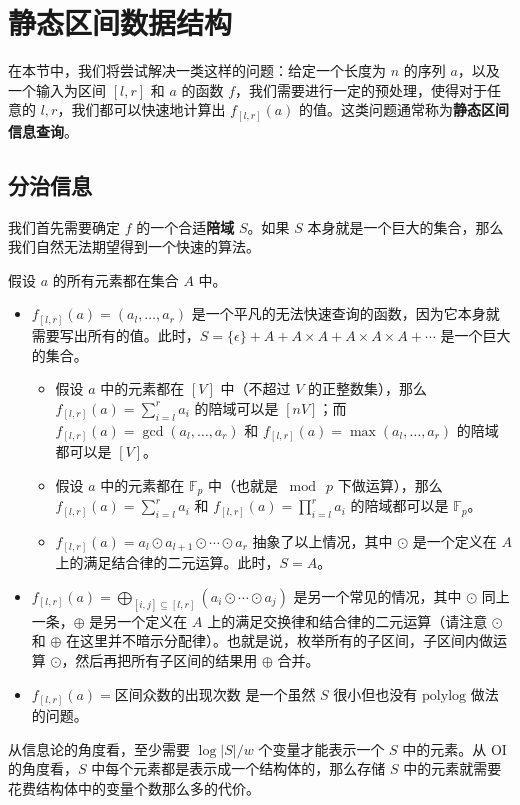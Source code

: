 \chapter{静态区间数据结构}

在本节中，我们将尝试解决一类这样的问题：给定一个长度为 $n$ 的序列 $a$，以及一个输入为区间 $[l,r]$ 和 $a$ 的函数 $f$，我们需要进行一定的预处理，使得对于任意的 $l,r$，我们都可以快速地计算出 $f_{[l,r]}(a)$ 的值。这类问题通常称为\textbf{静态区间信息查询}。


\section{分治信息}

我们首先需要确定 $f$ 的一个合适\textbf{陪域} $S$。如果 $S$ 本身就是一个巨大的集合，那么我们自然无法期望得到一个快速的算法。
\begin{example}
    假设 $a$ 的所有元素都在集合 $A$ 中。
    \begin{itemize}
        \item $f_{[l,r]}(a)=(a_l,\ldots,a_r)$ 是一个平凡的无法快速查询的函数，因为它本身就需要写出所有的值。此时，$S=\{\epsilon\}+A+ A\times A+ A\times A\times A+\cdots$ 是一个巨大的集合。
        \begin{itemize}
            \item 假设 $a$ 中的元素都在 $[V]$ 中（不超过 $V$ 的正整数集），那么 $f_{[l,r]}(a)=\sum_{i=l}^r a_i$ 的陪域可以是 $[nV]$；而 $f_{[l,r]}(a)=\gcd(a_{l},\ldots,a_{r})$ 和 $f_{[l,r]}(a)=\max(a_{l},\ldots,a_{r})$ 的陪域都可以是 $[V]$。
            \item 假设 $a$ 中的元素都在 $\mathbb F_p$ 中（也就是 $\bmod\ p$ 下做运算），那么 $f_{[l,r]}(a)=\sum_{i=l}^ra_i$ 和 $f_{[l,r]}(a)=\prod_{i=l}^r a_i$ 的陪域都可以是 $\mathbb F_p$。
            \item  $f_{[l,r]}(a)=a_l\odot a_{l+1} \odot\cdots\odot a_r$ 抽象了以上情况，其中 $\odot$ 是一个定义在 $A$ 上的满足结合律的二元运算。此时，$S=A$。 
        \end{itemize}
        \item $f_{[l,r]}(a)=\bigoplus_{[i,j]\subseteq [l,r]}\left(a_i\odot \cdots\odot a_{j}\right)$ 是另一个常见的情况，其中 $\odot$ 同上一条，$\oplus$ 是另一个定义在 $A$ 上的满足交换律和结合律的二元运算（请注意 $\odot$ 和 $\oplus$ 在这里并不暗示分配律）。也就是说，枚举所有的子区间，子区间内做运算 $\odot$，然后再把所有子区间的结果用 $\oplus$ 合并。
        \item $f_{[l,r]}(a)=\text{区间众数的出现次数}$ 是一个虽然 $S$ 很小但也没有 $\mathrm{polylog}$ 做法的问题。
    \end{itemize}
\end{example}
\begin{remark}
    从信息论的角度看，至少需要 $\log |S|/w$ 个变量才能表示一个 $S$ 中的元素。从 OI 的角度看，$S$ 中每个元素都是表示成一个结构体的，那么存储 $S$ 中的元素就需要花费结构体中的变量个数那么多的代价。
\end{remark}


